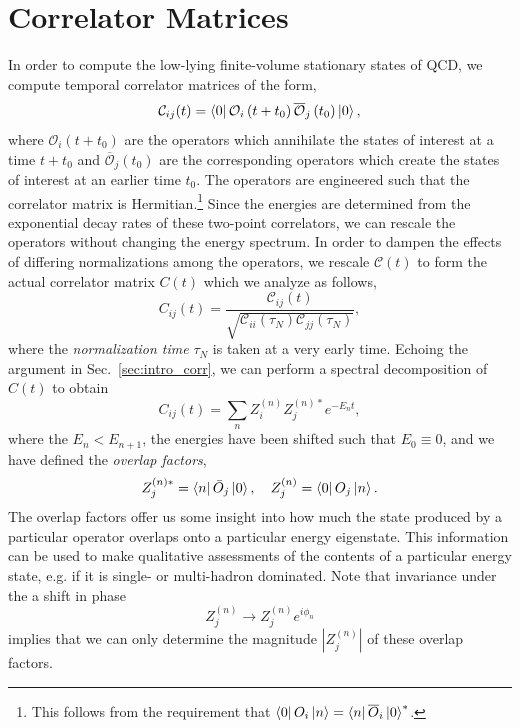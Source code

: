 \section{Correlator Matrices}\label{sec:correlator_matrices}
In order to compute the low-lying finite-volume stationary states of QCD, we compute temporal correlator matrices of the form,
\begin{equation}
    \mathcal{C}_{i j}(t)=\bra 0 \mathcal O_{i}\left(t+t_{0}\right) \overline{\mathcal O}_{j}\left(t_{0}\right)\ket 0,
\end{equation}
where $\mathcal O_i(t+t_0)$ are the operators which annihilate the states of interest at a time $t+t_0$ and $\overline{\mathcal O}_j(t_0)$ are the corresponding operators which create the states of interest at an earlier time $t_0$. The operators are engineered such that the correlator matrix is Hermitian.\footnote{This follows from the requirement that $\bra 0 O_i \ket n = \bra n \overline O_i \ket 0 ^*$.} Since the energies are determined from the exponential decay rates of these two-point correlators, we can rescale the operators without changing the energy spectrum. In order to dampen the effects of differing normalizations among the operators, we rescale $\mathcal C(t)$ to form the actual correlator matrix $C(t)$ which we analyze as follows,
\begin{equation}
    C_{ij}(t) = \frac{\mathcal C_{ij}(t)}{\sqrt{\mathcal C_{ii}(\tau_N) \mathcal C_{jj}(\tau_N)}},
\end{equation}
where the \emph{normalization time} $\tau_N$ is taken at a very early time. Echoing the argument in Sec.~\ref{sec:intro_corr}, we can perform a spectral decomposition of $C(t)$ to obtain
\begin{equation}\label{eq:corr_spec_decomp}
    C_{i j}(t)=\sum_{n} Z_{i}^{(n)} Z_{j}^{(n) *} e^{-E_{n} t},
\end{equation}
where the $E_n < E_{n+1}$, the energies have been shifted such that $E_0\equiv 0$, and we have defined the \emph{overlap factors},
\begin{equation}
    Z_{j}^{(n) *}=\bra n \bar{O}_{j}\ket 0, \quad Z_{j}^{(n)}=\bra 0 O_{j} \ket n.
\end{equation}
The overlap factors offer us some insight into how much the state produced by a particular operator overlaps onto a particular energy eigenstate. This information can be used to make qualitative assessments of the contents of a particular energy state, e.g. if it is single- or multi-hadron dominated. Note that invariance under the a shift in phase
\begin{equation}
    Z_{j}^{(n)} \rightarrow Z_{j}^{(n)} e^{i \phi_{n}}
\end{equation}
implies that we can only determine the magnitude $|Z_j^{(n)}|$ of these overlap factors.
